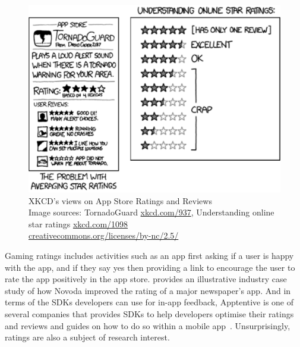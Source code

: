 \begin{figure}
    \centering
    \includegraphics[width=\linewidth]{images/xkcd/xkcd-combined.pdf}
    \caption{XKCD's views on App Store Ratings and Reviews \\{\footnotesize Image sources: TornadoGuard \href{https://xkcd.com/937}{xkcd.com/937}, Understanding online star ratings \href{https://xkcd.com/1098}{xkcd.com/1098} \\ \href{https://creativecommons.org/licenses/by-nc/2.5/}{creativecommons.org/licenses/by-nc/2.5/}}}
    \label{fig:xkcd-app-store-ratings}
\end{figure}


Gaming ratings includes activities such as an app first asking if a user is happy with the app, and if they say yes then providing a link to encourage the user to rate the app positively in the app store. \textcite{novoda_akan2016_asking_for_app_feedback_the_effective_way} provides an illustrative industry case study of how Novoda improved the rating of a major newspaper's app. And in terms of the SDKs developers can use for in-app feedback, Apptentive is one of several companies that provides SDKs to help developers optimise their ratings and reviews and guides on how to do so within a mobile app~. Unsurprisingly, ratings are also a subject of research interest.

